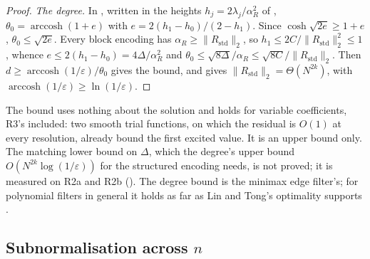 \begin{proof}
\emph{The degree.} In , written in the heights $h_j=2\lambda_j/\alpha_R^2$ of , $\theta_0=\operatorname{arccosh}(1+e)$ with $e=2(h_1-h_0)/(2-h_1)$. Since $\cosh\sqrt{2e}\ge1+e$, $\theta_0\le\sqrt{2e}$. Every block encoding has $\alpha_R\ge\|R_{\mathrm{std}}\|_2$, so $h_1\le2C/\|R_{\mathrm{std}}\|_2^2\le1$, whence $e\le2(h_1-h_0)=4\Delta/\alpha_R^2$ and $\theta_0\le\sqrt{8\Delta}/\alpha_R\le\sqrt{8C}/\|R_{\mathrm{std}}\|_2$. Then $d\ge\operatorname{arccosh}(1/\varepsilon)/\theta_0$ gives the bound, and  gives $\|R_{\mathrm{std}}\|_2=\Theta(N^{2k})$, with $\operatorname{arccosh}(1/\varepsilon)\ge\ln(1/\varepsilon)$.
\end{proof}

The bound uses nothing about the solution and holds for variable coefficients, R3's included: two smooth trial functions, on which the residual is $O(1)$ at every resolution, already bound the first excited value. It is an upper bound only. The matching lower bound on $\Delta$, which the degree's upper bound $O(N^{2k}\log(1/\varepsilon))$ for the structured encoding needs, is not proved; it is measured on R2a and R2b (). The degree bound is the minimax edge filter's; for polynomial filters in general it holds as far as Lin and Tong's optimality supports \cite{lintong2020groundstate}.

\subsection{Subnormalisation across \texorpdfstring{$n$}{n}}
\label{app:alpha-G}

